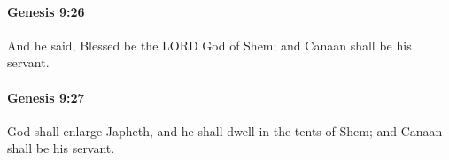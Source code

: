 		\paragraph{Genesis 9:26} %
			\label{GENESIS-9-26}

			And he said, Blessed be the LORD God of Shem; and Canaan shall be his servant.


		\paragraph{Genesis 9:27} %
			\label{GENESIS-9-27}

			God shall enlarge Japheth, and he shall dwell in the tents of Shem; and Canaan shall be his servant.


